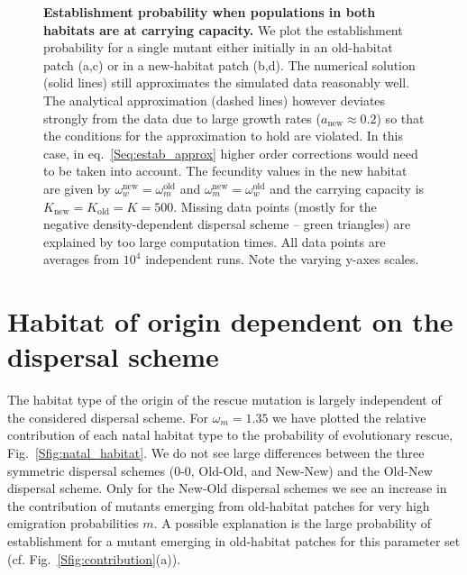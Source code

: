 \documentclass[a4paper,11pt]{scrartcl}
\newcommand{\chg}[1]{\textcolor{change}{#1}}
\begin{document}
\begin{figure}[h!]
  	\caption{\textbf{Establishment probability when populations in both habitats are at carrying capacity.} We plot the establishment probability for a single mutant either initially in an old-habitat patch (a,c) or in a new-habitat patch (b,d). The numerical solution (solid lines) still approximates the simulated data reasonably well. The analytical approximation (dashed lines) however deviates strongly from the data due to large growth rates ($a_{\text{new}}\approx 0.2$) so that the conditions for the approximation to hold are violated. In this case, in eq.~\eqref{Seq:estab_approx} higher order corrections would need to be taken into account. \chg{The fecundity values in the new habitat are given by $\omega_w^{\text{new}} = \omega_m^{\text{old}}$ and $\omega_m^{\text{new}} = \omega_w^{\text{old}}$ and the carrying capacity is $K_{\text{new}}=K_{\text{old}}=K=500$.} Missing data points (mostly for the negative density-dependent dispersal scheme -- green triangles) are explained by too large computation times. All data points are averages from $10^4$ independent runs. Note the varying y-axes scales.}
	\label{Sfig:pop_gen}
\end{figure}


\newpage
\section{Habitat of origin dependent on the dispersal scheme}
The habitat type of the origin of the rescue mutation is largely independent of the considered dispersal scheme. For $\omega_m=1.35$ we have plotted the relative contribution of each natal habitat type to the probability of evolutionary rescue, Fig.~\ref{Sfig:natal_habitat}. We do not see large differences between the three symmetric dispersal schemes (0-0, Old-Old, and New-New) and the Old-New dispersal scheme. \chg{Only for the New-Old dispersal schemes we see an increase in the contribution of mutants emerging from old-habitat patches for very high emigration probabilities $m$. A possible explanation is the large probability of establishment for a mutant emerging in old-habitat patches for this parameter set (cf. Fig.~\ref{Sfig:contribution}(a)).}
\end{document}
